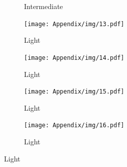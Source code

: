 \begin{appendices}
\begin{spacing}{1.5}
\begin{figure}[p]
\begin{subfigure}{.5\textwidth}
        \caption{Intermediate}
      \end{subfigure}
    \begin{subfigure}{.5\textwidth}
        \centering
        \texttt{[image: Appendix/img/13.pdf]}
        \caption{Light}
      \end{subfigure}%
      \begin{subfigure}{.5\textwidth}
        \centering
        \texttt{[image: Appendix/img/14.pdf]}
        \caption{Light}
      \end{subfigure}
    \begin{subfigure}{.5\textwidth}
        \centering
        \texttt{[image: Appendix/img/15.pdf]}
        \caption{Light}
      \end{subfigure}%
      \begin{subfigure}{.5\textwidth}
        \centering
        \texttt{[image: Appendix/img/16.pdf]}
        \caption{Light}
      \end{subfigure}
\end{figure}
\end{spacing}




\end{appendices}